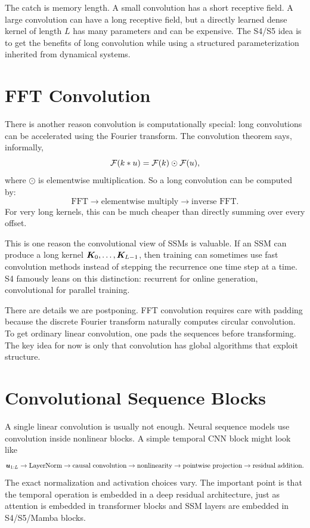 The catch is memory length. A small convolution has a short receptive field. A large
convolution can have a long receptive field, but a directly learned dense kernel of length
$L$ has many parameters and can be expensive. The S4/S5 idea is to get the benefits of
long convolution while using a structured parameterization inherited from dynamical
systems.

\section{FFT Convolution}

There is another reason convolution is computationally special: long convolutions can be
accelerated using the Fourier transform. The convolution theorem says, informally,
\[
  \mathcal{F}(k \ast u) = \mathcal{F}(k) \odot \mathcal{F}(u),
\]
where $\odot$ is elementwise multiplication. So a long convolution can be computed by:
\[
  \text{FFT} \rightarrow \text{elementwise multiply} \rightarrow \text{inverse FFT}.
\]
For very long kernels, this can be much cheaper than directly summing over every offset.

This is one reason the convolutional view of SSMs is valuable. If an SSM can produce a
long kernel $\bm{K}_0,\ldots,\bm{K}_{L-1}$, then training can sometimes use fast convolution
methods instead of stepping the recurrence one time step at a time. S4 famously leans on
this distinction: recurrent for online generation, convolutional for parallel training.

There are details we are postponing. FFT convolution requires care with padding because
the discrete Fourier transform naturally computes circular convolution. To get ordinary
linear convolution, one pads the sequences before transforming. The key idea for now is
only that convolution has global algorithms that exploit structure.

\section{Convolutional Sequence Blocks}

A single linear convolution is usually not enough. Neural sequence models use convolution
inside nonlinear blocks. A simple temporal CNN block might look like
\[
  \bm{u}_{1:L}
  \rightarrow
  \text{LayerNorm}
  \rightarrow
  \text{causal convolution}
  \rightarrow
  \text{nonlinearity}
  \rightarrow
  \text{pointwise projection}
  \rightarrow
  \text{residual addition}.
\]
The exact normalization and activation choices vary. The important point is that the
temporal operation is embedded in a deep residual architecture, just as attention is
embedded in transformer blocks and SSM layers are embedded in S4/S5/Mamba blocks.

